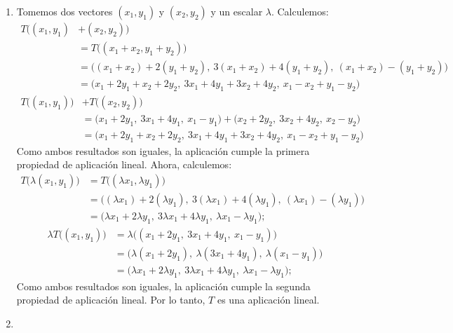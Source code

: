 \documentclass[11pt,a5]{aleph-examen}
\begin{document}
\begin{preguntas}
\begin{respuesta}
\begin{enumerate}[leftmargin=*]
\item 
    Tomemos dos vectores $(x_1,y_1)$ y $(x_2,y_2)$ y un escalar $\lambda$. Calculemos:
    \begin{align*}
        T\big((x_1,y_1)&+(x_2,y_2)\big)\\
        &=
        T\big((x_1+x_2,y_1+y_2)\big)
        \\
        &=
        \big((x_1+x_2)+2(y_1+y_2),\ 3(x_1+x_2)+4(y_1+y_2),\ (x_1+x_2)-(y_1+y_2)\big)
        \\
        &=
        \big(x_1+2y_1+x_2+2y_2,\ 3x_1+4y_1+3x_2+4y_2,\ x_1-x_2+y_1-y_2\big)
    \end{align*}
    \begin{align*}
        T\big((x_1,y_1)\big)& + T\big((x_2,y_2)\big)\\
        &=
        \big(x_1+2y_1,\ 3x_1+4y_1,\ x_1-y_1\big) + \big(x_2+2y_2,\ 3x_2+4y_2,\ x_2-y_2\big)
        \\
        &=
        \big(x_1+2y_1+x_2+2y_2,\ 3x_1+4y_1+3x_2+4y_2,\ x_1-x_2+y_1-y_2\big)
    \end{align*}
    Como ambos resultados son iguales, la aplicación cumple la primera propiedad de aplicación lineal. Ahora, calculemos:
    \begin{align*}
        T\big(\lambda(x_1,y_1)\big)
        &=
        T\big((\lambda x_1,\lambda y_1)\big)
        \\
        &=
        \big((\lambda x_1)+2(\lambda y_1),\ 3(\lambda x_1)+4(\lambda y_1),\ (\lambda x_1)-(\lambda y_1)\big)
        \\
        &=
        \big(\lambda x_1+2\lambda y_1,\ 3\lambda x_1+4\lambda y_1,\ \lambda x_1-\lambda y_1\big);
    \end{align*}
    \begin{align*}
        \lambda T\big((x_1,y_1)\big)
        &=
        \lambda\big((x_1+2y_1,\ 3x_1+4y_1,\ x_1-y_1)\big)
        \\
        &=
        \big(\lambda(x_1+2y_1),\ \lambda(3x_1+4y_1),\ \lambda(x_1-y_1)\big) \\
        &=
        \big(\lambda x_1+2\lambda y_1,\ 3\lambda x_1+4\lambda y_1,\ \lambda x_1-\lambda y_1\big);
    \end{align*}
    Como ambos resultados son iguales, la aplicación cumple la segunda propiedad de aplicación lineal. Por lo tanto, $T$ es una aplicación lineal.
\item

\end{enumerate}
\end{respuesta}
\end{preguntas}
\end{document}
